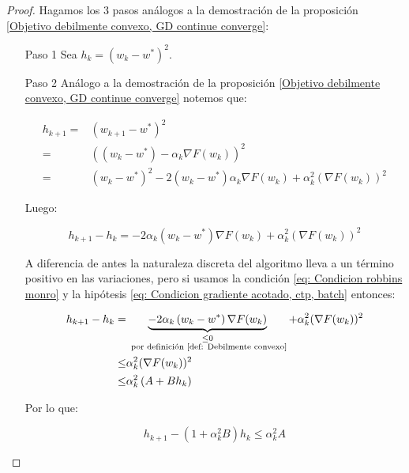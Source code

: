 \begin{proof}
	Hagamos los 3 pasos an\'alogos a la demostraci\'on de la proposici\'on \ref{Objetivo debilmente convexo, GD continue converge}:
	
	\begin{enumerate}
		\item [Paso 1] Sea $h_k = \left(w_k - w^*\right)^2$.
		\item [Paso 2] An\'alogo a la demostraci\'on de la proposici\'on \ref{Objetivo debilmente convexo, GD continue converge} notemos que:
		
		\begin{equation*}
			\begin{aligned}
			h_{k+1} = & \left(w_{k+1} - w^*\right)^2 \\
			 = & \left(\left(w_k - w^*\right) - \alpha_k \nabla F(w_k)\right)^2 \\
			 = & \left(w_k - w^*\right)^2 - 2 \left(w_k - w^*\right) \alpha_k \nabla F(w_k) + \alpha_k^2(\nabla F(w_k))^2
			\end{aligned}
		\end{equation*}
		
		Luego:
		
		\begin{equation*}
			h_{k+1} - h_k = -2 \alpha_k \left(w_k - w^* \right)\nabla F(w_k) + \alpha_k^2 (\nabla F(w_k))^2
		\end{equation*}
		
		A diferencia de antes la naturaleza discreta del algoritmo lleva a un t\'ermino positivo en las variaciones, pero si usamos la condici\'on \ref{eq: Condicion robbins monro} y la hip\'otesis \ref{eq: Condicion gradiente acotado, ctp, batch} entonces:
		
		\begin{equation*}
		\begin{aligned}
			h_{k+1} - h_k = & \underbrace{-2 \alpha_k \left(w_k - w^* \right)\nabla F(w_k)}_{\substack{\leq 0 \\ \text{ por definici\'on \ref{def: Debilmente convexo}}}}  + \alpha_k^2 (\nabla F(w_k))^2 \\
			\leq & \alpha_k^2 (\nabla F(w_k))^2 \\
			\leq & \alpha_k^2 \left(A + B h_k\right)
		\end{aligned}
		\end{equation*}
		
		Por lo que:
		
		\begin{equation}
		\label{eq: Variaciones sucesion lyapunov, objetivo debilmente convexo, incrmentes decrecientes}
			h_{k+1} - \left(1 + \alpha_k^2 B\right)h_k \leq \alpha_k^2A 
		\end{equation}
		

\end{enumerate}
\end{proof}
